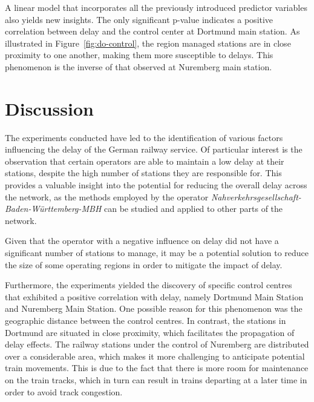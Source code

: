 \documentclass[12pt,a4paper]{article}
\begin{document}
A linear model that incorporates all the previously introduced predictor variables also yields new insights. 
The only significant p-value indicates a positive correlation between delay and the control center at Dortmund main station. 
As illustrated in Figure~\ref{fig:do-control}, the region managed stations are in close proximity to one another, making them more susceptible to delays. 
This phenomenon is the inverse of that observed at Nuremberg main station.

\maketitle
\section{\label{sec:Discussion}Discussion}

The experiments conducted have led to the identification of various factors influencing the delay of the German railway service. 
Of particular interest is the observation that certain operators are able to maintain a low delay at their stations, despite the high number of stations they are responsible for. 
This provides a valuable insight into the potential for reducing the overall delay across the network, as the methods employed by the operator \textit{Nahverkehrsgesellschaft-Baden-Württemberg-MBH} can be studied and applied to other parts of the network. 

Given that the operator with a negative influence on delay did not have a significant number of stations to manage, it may be a potential solution to reduce the size of some operating regions in order to mitigate the impact of delay. 

Furthermore, the experiments yielded the discovery of specific control centres that exhibited a positive correlation with delay, namely Dortmund Main Station and Nuremberg Main Station. 
One possible reason for this phenomenon was the geographic distance between the control centres. In contrast, the stations in Dortmund are situated in close proximity, which facilitates the propagation of delay effects. 
The railway stations under the control of Nuremberg are distributed over a considerable area, which makes it more challenging to anticipate potential train movements. 
This is due to the fact that there is more room for maintenance on the train tracks, which in turn can result in trains departing at a later time in order to avoid track congestion. 
\end{document}
